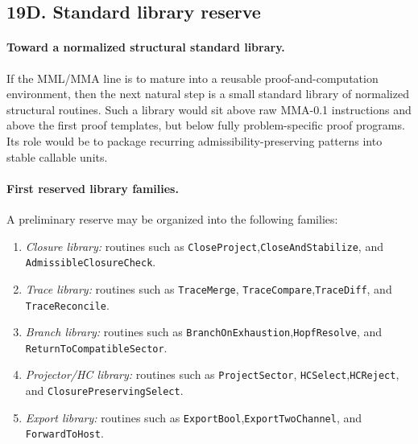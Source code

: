 \subsection*{19D. Standard library reserve}

\paragraph{Toward a normalized structural standard library.}
If the MML/MMA line is to mature into a reusable proof-and-computation environment, then the next natural step is a small standard library of normalized structural routines. Such a library would sit above raw MMA-0.1 instructions and above the first proof templates, but below fully problem-specific proof programs. Its role would be to package recurring admissibility-preserving patterns into stable callable units.

\paragraph{First reserved library families.}
A preliminary reserve may be organized into the following families:
\begin{enumerate}[label=(\alph*)]
    \item \emph{Closure library:} routines such as \texttt{CloseProject},\newline \texttt{CloseAndStabilize}, and \texttt{AdmissibleClosureCheck}.
    \item \emph{Trace library:} routines such as \texttt{TraceMerge}, \texttt{TraceCompare},\newline \texttt{TraceDiff}, and \texttt{TraceReconcile}.
    \item \emph{Branch library:} routines such as \texttt{BranchOnExhaustion},\newline \texttt{HopfResolve}, and \texttt{ReturnToCompatibleSector}.
    \item \emph{Projector/HC library:} routines such as \texttt{ProjectSector}, \texttt{HCSelect},\newline \texttt{HCReject}, and \texttt{ClosurePreservingSelect}.
    \item \emph{Export library:} routines such as \texttt{ExportBool},\newline \texttt{ExportTwoChannel}, and \texttt{ForwardToHost}.
\end{enumerate}

